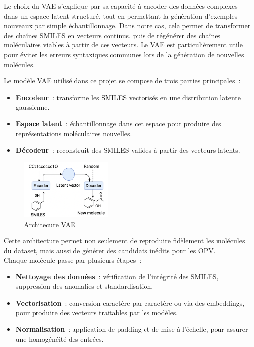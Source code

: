 Le choix du VAE s'explique par sa capacité à encoder des données complexes dans
un espace latent structuré, tout en permettant la génération d'exemples nouveaux
par simple échantillonnage. Dans notre cas, cela permet de transformer des chaînes
SMILES en vecteurs continus, puis de régénérer des chaînes moléculaires viables à
partir de ces vecteurs. Le VAE est particulièrement utile pour éviter les erreurs
syntaxiques communes lors de la génération de nouvelles molécules.

Le modèle VAE utilisé dans ce projet se compose de trois parties principales :

\begin{itemize}
    \item \textbf{Encodeur} : transforme les SMILES vectorisés en une distribution latente gaussienne.
    \item \textbf{Espace latent} : échantillonnage dans cet espace pour produire des représentations moléculaires nouvelles.
    \item \textbf{Décodeur} : reconstruit des SMILES valides à partir des vecteurs latents.
\end{itemize}


\begin{figure}[H]
    \centering
    \includegraphics[width=0.4\textwidth]{Architecture/vae.png}
    \caption{Architecure VAE}
\end{figure}

Cette architecture permet non seulement de reproduire fidèlement les molécules du
dataset, mais aussi de générer des candidats inédits pour les OPV. \\

Chaque molécule passe par plusieurs étapes :

\begin{itemize}
    \item \textbf{Nettoyage des données} : vérification de l'intégrité des SMILES, suppression des anomalies et standardisation.
    \item \textbf{Vectorisation} : conversion caractère par caractère ou via des embeddings, pour produire des vecteurs traitables par les modèles.
    \item \textbf{Normalisation} : application de padding et de mise à l'échelle, pour assurer une homogénéité des entrées.
\end{itemize}

